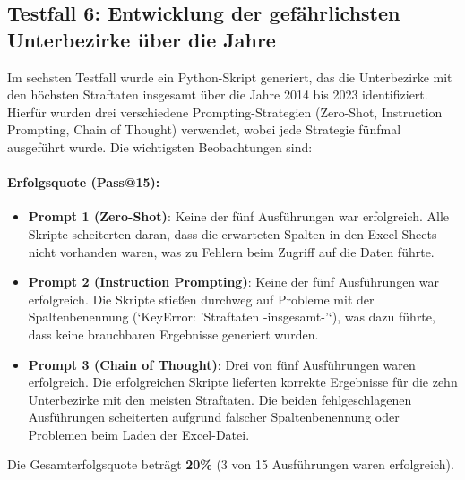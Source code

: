 \documentclass[11pt,a4paper]{article}
\begin{document}
\subsection{Testfall 6: Entwicklung der gefährlichsten Unterbezirke über die Jahre}
\label{subsec:auswertung_testfall6}

Im sechsten Testfall wurde ein Python-Skript generiert, das die Unterbezirke mit den höchsten Straftaten insgesamt über die Jahre 2014 bis 2023 identifiziert. Hierfür wurden drei verschiedene Prompting-Strategien (Zero-Shot, Instruction Prompting, Chain of Thought) verwendet, wobei jede Strategie fünfmal ausgeführt wurde. Die wichtigsten Beobachtungen sind:

\paragraph{Erfolgsquote (Pass@15):}
\begin{itemize}
    \item \textbf{Prompt 1 (Zero-Shot)}: Keine der fünf Ausführungen war erfolgreich. Alle Skripte scheiterten daran, dass die erwarteten Spalten in den Excel-Sheets nicht vorhanden waren, was zu Fehlern beim Zugriff auf die Daten führte.
    \item \textbf{Prompt 2 (Instruction Prompting)}: Keine der fünf Ausführungen war erfolgreich. Die Skripte stießen durchweg auf Probleme mit der Spaltenbenennung (`KeyError: 'Straftaten -insgesamt-'`), was dazu führte, dass keine brauchbaren Ergebnisse generiert wurden.
    \item \textbf{Prompt 3 (Chain of Thought)}: Drei von fünf Ausführungen waren erfolgreich. Die erfolgreichen Skripte lieferten korrekte Ergebnisse für die zehn Unterbezirke mit den meisten Straftaten. Die beiden fehlgeschlagenen Ausführungen scheiterten aufgrund falscher Spaltenbenennung oder Problemen beim Laden der Excel-Datei.
\end{itemize}
Die Gesamterfolgsquote beträgt \textbf{20\%} (3 von 15 Ausführungen waren erfolgreich).

\begin{table}[h]
    \centering
    \caption{Ergebnisse von Testfall 6}
    \label{tab:auswertung_testfall6}
\end{table}
\end{document}
